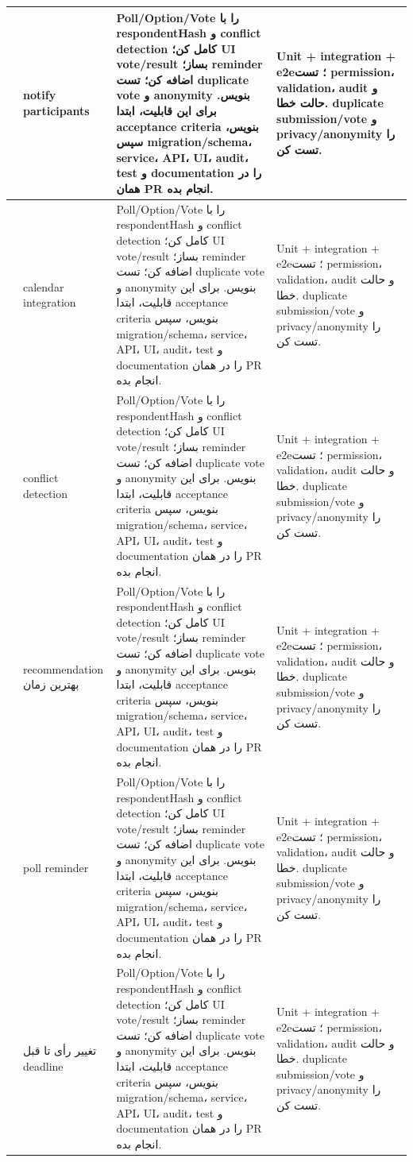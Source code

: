 \documentclass[11pt,a4paper]{article}
\begin{document}
\begin{longtable}{|>{\raggedleft\arraybackslash}p{}|>{\raggedleft\arraybackslash}p{}|>{\raggedleft\arraybackslash}p{}|>{\raggedleft\arraybackslash}p{}|}
192 & notify participants & Poll/Option/Vote را با respondentHash و conflict detection کامل کن؛ UI vote/result بساز؛ reminder اضافه کن؛ تست duplicate vote و anonymity بنویس. برای این قابلیت، ابتدا acceptance criteria بنویس، سپس migration/schema، service، API، UI، audit، test و documentation را در همان PR انجام بده. & Unit + integration + e2e؛ تست permission، validation، audit و حالت خطا. duplicate submission/vote و privacy/anonymity را تست کن. \\ \hline
193 & calendar integration & Poll/Option/Vote را با respondentHash و conflict detection کامل کن؛ UI vote/result بساز؛ reminder اضافه کن؛ تست duplicate vote و anonymity بنویس. برای این قابلیت، ابتدا acceptance criteria بنویس، سپس migration/schema، service، API، UI، audit، test و documentation را در همان PR انجام بده. & Unit + integration + e2e؛ تست permission، validation، audit و حالت خطا. duplicate submission/vote و privacy/anonymity را تست کن. \\ \hline
194 & conflict detection & Poll/Option/Vote را با respondentHash و conflict detection کامل کن؛ UI vote/result بساز؛ reminder اضافه کن؛ تست duplicate vote و anonymity بنویس. برای این قابلیت، ابتدا acceptance criteria بنویس، سپس migration/schema، service، API، UI، audit، test و documentation را در همان PR انجام بده. & Unit + integration + e2e؛ تست permission، validation، audit و حالت خطا. duplicate submission/vote و privacy/anonymity را تست کن. \\ \hline
195 & recommendation بهترین زمان & Poll/Option/Vote را با respondentHash و conflict detection کامل کن؛ UI vote/result بساز؛ reminder اضافه کن؛ تست duplicate vote و anonymity بنویس. برای این قابلیت، ابتدا acceptance criteria بنویس، سپس migration/schema، service، API، UI، audit، test و documentation را در همان PR انجام بده. & Unit + integration + e2e؛ تست permission، validation، audit و حالت خطا. duplicate submission/vote و privacy/anonymity را تست کن. \\ \hline
196 & poll reminder & Poll/Option/Vote را با respondentHash و conflict detection کامل کن؛ UI vote/result بساز؛ reminder اضافه کن؛ تست duplicate vote و anonymity بنویس. برای این قابلیت، ابتدا acceptance criteria بنویس، سپس migration/schema، service، API، UI، audit، test و documentation را در همان PR انجام بده. & Unit + integration + e2e؛ تست permission، validation، audit و حالت خطا. duplicate submission/vote و privacy/anonymity را تست کن. \\ \hline
197 & تغییر رأی تا قبل deadline & Poll/Option/Vote را با respondentHash و conflict detection کامل کن؛ UI vote/result بساز؛ reminder اضافه کن؛ تست duplicate vote و anonymity بنویس. برای این قابلیت، ابتدا acceptance criteria بنویس، سپس migration/schema، service، API، UI، audit، test و documentation را در همان PR انجام بده. & Unit + integration + e2e؛ تست permission، validation، audit و حالت خطا. duplicate submission/vote و privacy/anonymity را تست کن. \\ \hline

\end{longtable}
\end{document}
